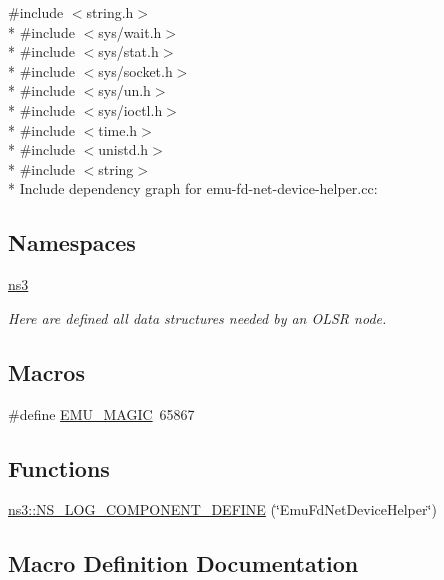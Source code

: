 {\ttfamily \#include $<$string.\+h$>$}\\*
{\ttfamily \#include $<$sys/wait.\+h$>$}\\*
{\ttfamily \#include $<$sys/stat.\+h$>$}\\*
{\ttfamily \#include $<$sys/socket.\+h$>$}\\*
{\ttfamily \#include $<$sys/un.\+h$>$}\\*
{\ttfamily \#include $<$sys/ioctl.\+h$>$}\\*
{\ttfamily \#include $<$time.\+h$>$}\\*
{\ttfamily \#include $<$unistd.\+h$>$}\\*
{\ttfamily \#include $<$string$>$}\\*
Include dependency graph for emu-\/fd-\/net-\/device-\/helper.cc\+:
\subsection*{Namespaces}
\begin{DoxyCompactItemize}
\item 
 \hyperlink{namespacens3}{ns3}
\begin{DoxyCompactList}\small\item\em Here are defined all data structures needed by an O\+L\+SR node. \end{DoxyCompactList}\end{DoxyCompactItemize}
\subsection*{Macros}
\begin{DoxyCompactItemize}
\item 
\#define \hyperlink{emu-fd-net-device-helper_8cc_adc226a140a49fe19a57e21bbe86341e4}{E\+M\+U\+\_\+\+M\+A\+G\+IC}~65867
\end{DoxyCompactItemize}
\subsection*{Functions}
\begin{DoxyCompactItemize}
\item 
\hyperlink{namespacens3_a27bf9e4dcf47f45482b83ff47de5427e}{ns3\+::\+N\+S\+\_\+\+L\+O\+G\+\_\+\+C\+O\+M\+P\+O\+N\+E\+N\+T\+\_\+\+D\+E\+F\+I\+NE} (\char`\"{}Emu\+Fd\+Net\+Device\+Helper\char`\"{})
\end{DoxyCompactItemize}


\subsection{Macro Definition Documentation}
